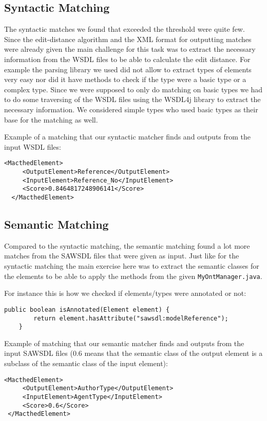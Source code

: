 \documentclass[a4paper, 11pt]{article}
\begin{document}
\subsection*{Syntactic Matching}
The syntactic matches we found that exceeded the threshold were quite few. Since the edit-distance algorithm and the XML format for outputting matches were already given the main challenge for this task was to extract the necessary information from the WSDL files to be able to calculate the edit distance. For example the parsing library we used did not allow to extract types of elements very easy nor did it have methods to check if the type were a basic type or a complex type. Since we were supposed to only do matching on basic types we had to do some traversing of the WSDL files using the WSDL4j library to extract the necessary information. We considered simple types who used basic types as their base for the matching as well.

Example of a matching that our syntactic matcher finds and outputs from the input WSDL files:
\lstset{language=XML}
\begin{lstlisting}[frame=single,style=base]
  <MacthedElement>
     <OutputElement>Reference</OutputElement>
     <InputElement>Reference_No</InputElement>
     <Score>0.8464817248906141</Score>
  </MacthedElement>
\end{lstlisting}

\subsection*{Semantic Matching}
Compared to the syntactic matching, the semantic matching found a lot more matches from the SAWSDL files that were given as input. Just like for the syntactic matching the main exercise here was to extract the semantic classes for the elements to be able to apply the methods from the given \texttt{MyOntManager.java}.

For instance this is how we checked if elements/types were annotated or not:
\begin{lstlisting}[frame=single,style=java]
public boolean isAnnotated(Element element) {
        return element.hasAttribute("sawsdl:modelReference");
    }
\end{lstlisting}

Example of matching that our semantic matcher finds and outputs from the input SAWSDL files (0.6 means that the semantic class of the output element is a subclass of the semantic class of the input element):
\begin{lstlisting}[frame=single,style=base]
  <MacthedElement>
     <OutputElement>AuthorType</OutputElement>
     <InputElement>AgentType</InputElement>
     <Score>0.6</Score>
 </MacthedElement>
\end{lstlisting}
\end{document}
